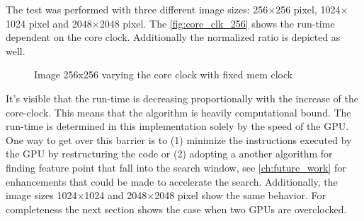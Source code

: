 The test was performed with three different image sizes: 256$\times$256 pixel, 
1024$\times$1024 pixel and 2048$\times$2048 pixel. The \autoref{fig:core_clk_256}
shows the run-time dependent on the core clock. Additionally the normalized
ratio {\color{red}{clock/time}} is depicted as well. 

\begin{figure}[ht]
  \centering



  \tableA

 \label{fig:core_clk_256}%
 \caption{Image 256x256 varying the core clock with fixed mem clock}
\end{figure}

It's visible that the run-time is decreasing proportionally with the increase of
the core-clock. This means that the algorithm is heavily computational bound.
The run-time is determined in this implementation solely by the speed of the
\gls{GPU}. One way to get over this barrier is to (1) minimize the instructions
executed by the \gls{GPU} by restructuring the code or (2) adopting a another
algorithm for finding feature point that fall into the search window, see
\autoref{ch:future_work} for enhancements that could be made to accelerate the
search. Additionally, the image sizes 1024$\times$1024 and 2048$\times$2048
pixel show the same behavior.
For completeness the next section shows the case when two \glspl{GPU} are 
overclocked.


